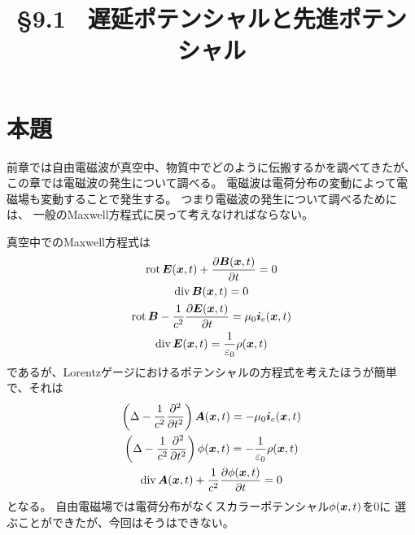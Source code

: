 \documentclass[a4paper, 10pt]{jsarticle}
\title{\S 9.1 \ 遅延ポテンシャルと先進ポテンシャル}
\author{}
\theoremstyle{definition}
\def\vec#1{\mbox{\boldmath $#1$}}
\newcommand{\pdif}[2]{\frac{\partial #1}{\partial #2}}
\DeclareMathOperator{\Div}{div}
\DeclareMathOperator{\Rot}{rot}
\begin{document}
\maketitle

\section{本題}

前章では自由電磁波が真空中、物質中でどのように伝搬するかを調べてきたが、
この章では電磁波の発生について調べる。
電磁波は電荷分布の変動によって電磁場も変動することで発生する。
つまり電磁波の発生について調べるためには、
一般のMaxwell方程式に戻って考えなければならない。

真空中でのMaxwell方程式は
\begin{gather}
	\Rot \vec{E}(\vec{x}, t) + \pdif{\vec{B}(\vec{x}, t)}{t} = 0 \\
	\Div \vec{B}(\vec{x}, t) = 0 \\
	\Rot \vec{B} - \frac{1}{c^2} \pdif{\vec{E}(\vec{x}, t)}{t}
	= \mu_0 \vec{i}_e (\vec{x}, t) \\
	\Div \vec{E}(\vec{x}, t) = \frac{1}{\varepsilon_0} \rho(\vec{x}, t)
\end{gather}
であるが、Lorentzゲージにおけるポテンシャルの方程式を考えたほうが簡単で、それは
\begin{gather}
	\begin{gathered}
		\left( \Delta - \frac{1}{c^2} \pdif{^2}{t^2} \right) \vec{A}(\vec{x}, t)
		= -\mu_0 \vec{i}_e(\vec{x}, t) \\
		\left( \Delta - \frac{1}{c^2} \pdif{^2}{t^2} \right) \phi(\vec{x}, t)
		= -\frac{1}{\varepsilon_0} \rho(\vec{x}, t)	
	\end{gathered}
	\label{eq:wave} \\
	\Div \vec{A}(\vec{x}, t) + \frac{1}{c^2} \pdif{\phi(\vec{x}, t)}{t} = 0
	\label{eq:Lorentz}
\end{gather}
となる。
自由電磁場では電荷分布がなくスカラーポテンシャル$\phi(\vec{x}, t)$を0に
選ぶことができたが、今回はそうはできない。
\end{document}
